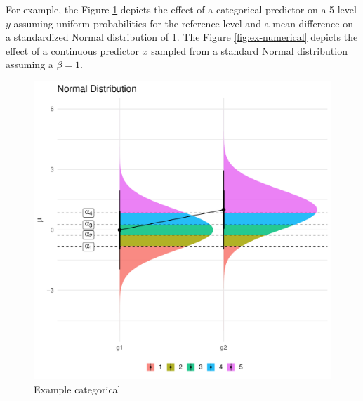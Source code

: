 \documentclass[
  man,floatsintext]{apa6}
\begin{document}
For example, the Figure \ref{fig:ex-categorical} depicts the effect of a categorical predictor on a 5-level \(y\) assuming uniform probabilities for the reference level and a mean difference on a standardized Normal distribution of 1. The Figure \ref{fig:ex-numerical} depicts the effect of a continuous predictor \(x\) sampled from a standard Normal distribution assuming a \(\beta = 1\).

\begin{figure}

{\centering \includegraphics{paper-new_files/figure-latex/ex-categorical-1} 

}

\caption{Example categorical}\label{fig:ex-categorical}
\end{figure}
\end{document}
